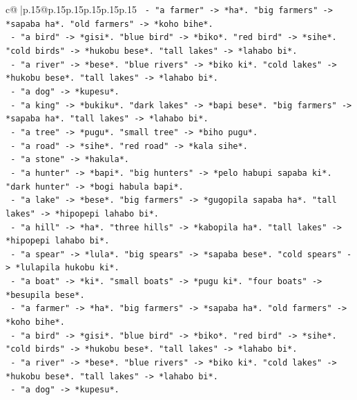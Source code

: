 \documentclass{article}
\begin{document}
{\begin{supertabular}{c@{$\;$}|p{.15\linewidth}@{}p{.15\linewidth}p{.15\linewidth}p{.15\linewidth}p{.15\linewidth}p{.15\linewidth}}
{{{\texttt{            {-} "a farmer" {-}> *ha*. "big farmers" {-}> *sapaba ha*. "old farmers" {-}> *koho bihe*.} \\
\texttt{            {-} "a bird" {-}> *gisi*. "blue bird" {-}> *biko*. "red bird" {-}> *sihe*. "cold birds" {-}> *hukobu bese*. "tall lakes" {-}> *lahabo bi*.} \\
\texttt{            {-} "a river" {-}> *bese*. "blue rivers" {-}> *biko ki*. "cold lakes" {-}> *hukobu bese*. "tall lakes" {-}> *lahabo bi*.} \\
\texttt{            {-} "a dog" {-}> *kupesu*.} \\
\texttt{            {-} "a king" {-}> *bukiku*. "dark lakes" {-}> *bapi bese*. "big farmers" {-}> *sapaba ha*. "tall lakes" {-}> *lahabo bi*.} \\
\texttt{            {-} "a tree" {-}> *pugu*. "small tree" {-}> *biho pugu*.} \\
\texttt{            {-} "a road" {-}> *sihe*. "red road" {-}> *kala sihe*.} \\
\texttt{            {-} "a stone" {-}> *hakula*.} \\
\texttt{            {-} "a hunter" {-}> *bapi*. "big hunters" {-}> *pelo habupi sapaba ki*. "dark hunter" {-}> *bogi habula bapi*.} \\
\texttt{            {-} "a lake" {-}> *bese*. "big farmers" {-}> *gugopila sapaba ha*. "tall lakes" {-}> *hipopepi lahabo bi*.} \\
\texttt{            {-} "a hill" {-}> *ha*. "three hills" {-}> *kabopila ha*. "tall lakes" {-}> *hipopepi lahabo bi*.} \\
\texttt{            {-} "a spear" {-}> *lula*. "big spears" {-}> *sapaba bese*. "cold spears" {-}> *lulapila hukobu ki*.} \\
\texttt{            {-} "a boat" {-}> *ki*. "small boats" {-}> *pugu ki*. "four boats" {-}> *besupila bese*.} \\
\texttt{            {-} "a farmer" {-}> *ha*. "big farmers" {-}> *sapaba ha*. "old farmers" {-}> *koho bihe*.} \\
\texttt{            {-} "a bird" {-}> *gisi*. "blue bird" {-}> *biko*. "red bird" {-}> *sihe*. "cold birds" {-}> *hukobu bese*. "tall lakes" {-}> *lahabo bi*.} \\
\texttt{            {-} "a river" {-}> *bese*. "blue rivers" {-}> *biko ki*. "cold lakes" {-}> *hukobu bese*. "tall lakes" {-}> *lahabo bi*.} \\
\texttt{            {-} "a dog" {-}> *kupesu*.} \\
}}}
\end{supertabular}}
\end{document}
